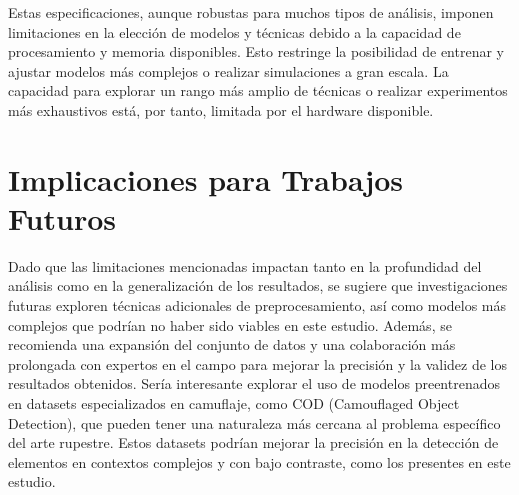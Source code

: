 Estas especificaciones, aunque robustas para muchos tipos de análisis, imponen limitaciones en la elección de modelos y técnicas debido a la capacidad de procesamiento y memoria disponibles. Esto restringe la posibilidad de entrenar y ajustar modelos más complejos o realizar simulaciones a gran escala. La capacidad para explorar un rango más amplio de técnicas o realizar experimentos más exhaustivos está, por tanto, limitada por el hardware disponible.

\section{Implicaciones para Trabajos Futuros}
Dado que las limitaciones mencionadas impactan tanto en la profundidad del análisis como en la generalización de los resultados, se sugiere que investigaciones futuras exploren técnicas adicionales de preprocesamiento, así como modelos más complejos que podrían no haber sido viables en este estudio. Además, se recomienda una expansión del conjunto de datos y una colaboración más prolongada con expertos en el campo para mejorar la precisión y la validez de los resultados obtenidos.
Sería interesante explorar el uso de modelos preentrenados en datasets especializados en camuflaje, como COD (Camouflaged Object Detection), que pueden tener una naturaleza más cercana al problema específico del arte rupestre. Estos datasets podrían mejorar la precisión en la detección de elementos en contextos complejos y con bajo contraste, como los presentes en este estudio.
